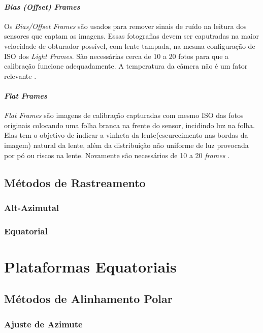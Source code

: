 \paragraph{\textit{Bias (Offset) Frames}}

Os \textit{Bias/Offset Frames} são usados para remover sinais de ruído na leitura dos sensores que captam as imagens. Essas fotografias devem ser caputradas na maior velocidade de obturador possível, com lente tampada, na mesma configuração de ISO dos \textit{Light Frames}. São necessárias cerca de 10 a 20 fotos para que a calibração funcione adequadamente. A temperatura da câmera não é um fator relevante \cite{man:deepskystackerfaq}.


\paragraph{\textit{Flat Frames}}
\textit{Flat Frames} são imagens de calibração capturadas com mesmo ISO das fotos originais colocando uma folha branca na frente do sensor, incidindo luz na folha. Elas tem o objetivo de indicar a vinheta da lente(escurecimento nas bordas da imagem) natural da lente, além da distribuição não uniforme de luz provocada por pó ou riscos na lente. Novamente são necessários de 10 a 20 \textit{frames}
\cite{man:deepskystackerfaq}.


\subsection{Métodos de Rastreamento}

\subsubsection{Alt-Azimutal}
\subsubsection{Equatorial}

\section{Plataformas Equatoriais}

\subsection{Métodos de Alinhamento Polar}

\subsubsection{Ajuste de Azimute}


